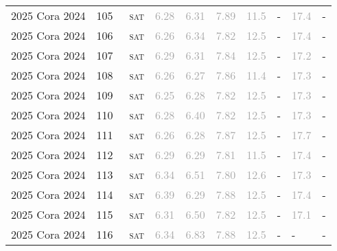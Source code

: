 \begin{center}
{\begin{longtable}{@{}llllllllll@{}}
2025 Cora 2024 & 105 & ~\textsc{sat} & \textcolor{darkgray}{6.28} & \textcolor{darkgray}{6.31} & \textcolor{darkgray}{7.89} & \textcolor{darkgray}{11.5} & - & \textcolor{darkgray}{17.4} & - \\
2025 Cora 2024 & 106 & ~\textsc{sat} & \textcolor{darkgray}{6.26} & \textcolor{darkgray}{6.34} & \textcolor{darkgray}{7.82} & \textcolor{darkgray}{12.5} & - & \textcolor{darkgray}{17.4} & - \\
2025 Cora 2024 & 107 & ~\textsc{sat} & \textcolor{darkgray}{6.29} & \textcolor{darkgray}{6.31} & \textcolor{darkgray}{7.84} & \textcolor{darkgray}{12.5} & - & \textcolor{darkgray}{17.2} & - \\
2025 Cora 2024 & 108 & ~\textsc{sat} & \textcolor{darkgray}{6.26} & \textcolor{darkgray}{6.27} & \textcolor{darkgray}{7.86} & \textcolor{darkgray}{11.4} & - & \textcolor{darkgray}{17.3} & - \\
2025 Cora 2024 & 109 & ~\textsc{sat} & \textcolor{darkgray}{6.25} & \textcolor{darkgray}{6.28} & \textcolor{darkgray}{7.82} & \textcolor{darkgray}{12.5} & - & \textcolor{darkgray}{17.3} & - \\
2025 Cora 2024 & 110 & ~\textsc{sat} & \textcolor{darkgray}{6.28} & \textcolor{darkgray}{6.40} & \textcolor{darkgray}{7.82} & \textcolor{darkgray}{12.5} & - & \textcolor{darkgray}{17.3} & - \\
2025 Cora 2024 & 111 & ~\textsc{sat} & \textcolor{darkgray}{6.26} & \textcolor{darkgray}{6.28} & \textcolor{darkgray}{7.87} & \textcolor{darkgray}{12.5} & - & \textcolor{darkgray}{17.7} & - \\
2025 Cora 2024 & 112 & ~\textsc{sat} & \textcolor{darkgray}{6.29} & \textcolor{darkgray}{6.29} & \textcolor{darkgray}{7.81} & \textcolor{darkgray}{11.5} & - & \textcolor{darkgray}{17.4} & - \\
2025 Cora 2024 & 113 & ~\textsc{sat} & \textcolor{darkgray}{6.34} & \textcolor{darkgray}{6.51} & \textcolor{darkgray}{7.80} & \textcolor{darkgray}{12.6} & - & \textcolor{darkgray}{17.3} & - \\
2025 Cora 2024 & 114 & ~\textsc{sat} & \textcolor{darkgray}{6.39} & \textcolor{darkgray}{6.29} & \textcolor{darkgray}{7.88} & \textcolor{darkgray}{12.5} & - & \textcolor{darkgray}{17.4} & - \\
2025 Cora 2024 & 115 & ~\textsc{sat} & \textcolor{darkgray}{6.31} & \textcolor{darkgray}{6.50} & \textcolor{darkgray}{7.82} & \textcolor{darkgray}{12.5} & - & \textcolor{darkgray}{17.1} & - \\
2025 Cora 2024 & 116 & ~\textsc{sat} & \textcolor{darkgray}{6.34} & \textcolor{darkgray}{6.83} & \textcolor{darkgray}{7.88} & \textcolor{darkgray}{12.5} & - & - & - \\

\end{longtable}}
\end{center}
